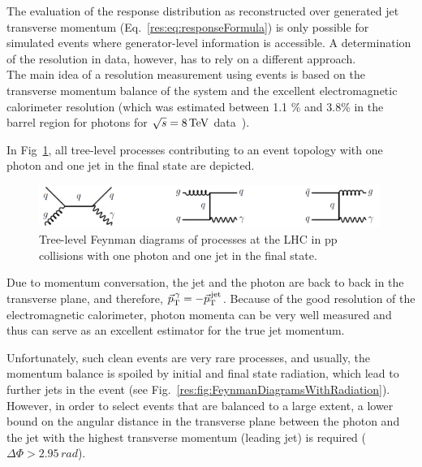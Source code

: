 
The evaluation of the response distribution as reconstructed over generated jet transverse momentum (Eq.~\eqref{res:eq:responseFormula})
is only possible for simulated events where generator-level information is accessible. 
A determination of the resolution in data, however, has to rely on a different approach.\\

The main idea of a resolution measurement using \GAMJET events is based on the transverse momentum balance of the \GAMJET system and the excellent electromagnetic calorimeter resolution
(which was estimated between 1.1 \% and 3.8\% in the barrel region for photons for $\sqrt{s}=8\,\text{Te}\kern-0.06667em\text{V}$ data~\cite{bib:CMS:PhotonResolution_8TeV}).

In Fig~\ref{res:fig:FeynmanDiagrams}, all tree-level processes contributing to an event topology with one photon and one jet in the final state are depicted. 
\begin{figure}[b]
  \centering
      \includegraphics[width=0.99\textwidth]{figures/resolution/generalApproach/FeynmanDiagram.pdf}
  \caption{Tree-level Feynman diagrams of processes at the LHC in pp collisions with one photon and one jet in the final state.}  
  \label{res:fig:FeynmanDiagrams}
\end{figure}
Due to momentum conversation, the jet and the photon are back to back in the transverse plane, and therefore, $\vec{p}_{\text{T}}^{\,\gamma} = -\vec{p}_{\text{T}}^{\,\text{jet}}$. 
Because of the good resolution of the electromagnetic calorimeter, photon momenta can be very well measured 
and thus can serve as an excellent estimator for the true jet momentum.


Unfortunately, such clean events are very rare processes, and usually, the momentum balance is spoiled by initial and final state radiation, which lead to further jets in the event 
(see Fig.~\ref{res:fig:FeynmanDiagramsWithRadiation}). 
However, in order to select events that are balanced to a large extent, a lower bound 
on the angular distance in the transverse plane between the photon and the jet with the highest transverse momentum (leading jet) is required ($\Delta\Phi>2.95\,\unit{rad}$). 

